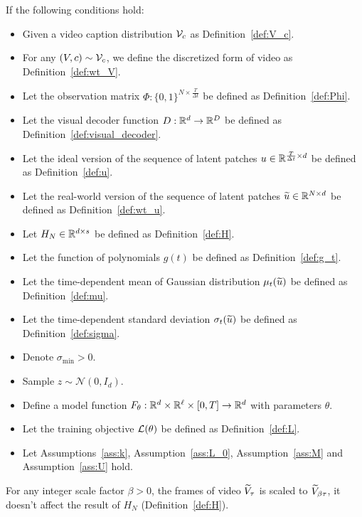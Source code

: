 \begin{lemma}\label{lem:timescale_robustness}
    If the following conditions hold:
    \begin{itemize}
        \item Given a video caption distribution ${\cal V}_c$ as Definition~\ref{def:V_c}.
        \item For any $(V, c) \sim {\cal V}_c$, we define the discretized form of video as Definition~\ref{def:wt_V}.
        \item Let the observation matrix $\Phi: \{0, 1\}^{N \times \frac{T}{\Delta t}}$ be defined as Definition~\ref{def:Phi}.
        \item Let the visual decoder function $D: \mathbb{R}^d \rightarrow \mathbb{R}^D$ be defined as Definition~\ref{def:visual_decoder}.
        \item Let the ideal version of the sequence of latent patches $u \in \mathbb{R}^{\frac{T}{\Delta t} \times d}$ be defined as Definition~\ref{def:u}.
        \item Let the real-world version of the sequence of latent patches $\widetilde{u} \in \mathbb{R}^{N \times d}$ be defined as Definition~\ref{def:wt_u}.
        \item Let $H_N \in \mathbb{R}^{d \times s}$ be defined as Definition~\ref{def:H}.
        \item Let the function of polynomials $g(t)$ be defined as Definition~\ref{def:g_t}.
        \item Let the time-dependent mean of Gaussian distribution $\mu_t(\widetilde{u})$ be defined as Definition~\ref{def:mu}.
        \item Let the time-dependent standard deviation $\sigma_t(\widetilde{u})$ be defined as Definition~\ref{def:sigma}.
        \item Denote $\sigma_{\min} > 0$.
        \item Sample $z \sim \mathcal{N}(0, I_d)$.
        \item Define a model function $F_\theta: \mathbb{R}^d \times \mathbb{R}^\ell \times [0, T] \rightarrow \mathbb{R}^d$ with parameters $\theta$.
        \item Let the training objective ${\cal L}(\theta)$ be defined as Definition~\ref{def:L}.
        \item Let Assumptions~\ref{ass:k}, Assumption~\ref{ass:L_0}, Assumption~\ref{ass:M} and Assumption~\ref{ass:U} hold.
    \end{itemize}
    For any integer scale factor $\beta > 0$, the frames of video $\widetilde{V}_{\tau}$ is scaled to $\widetilde{V}_{\beta \tau}$, it doesn't affect the result of $H_N$ (Definition~\ref{def:H}).
\end{lemma}

